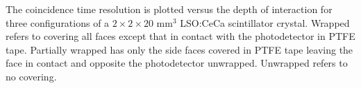 \label{fig:ctrdoi-20} The coincidence time resolution is plotted versus the depth of interaction for three configurations of a $2\times2\times20$ mm$^3$ LSO:CeCa scintillator crystal. Wrapped refers to covering all faces except that in contact with the photodetector in PTFE tape. Partially wrapped has only the side faces covered in PTFE tape leaving the face in contact and opposite the photodetector unwrapped. Unwrapped refers to no covering.